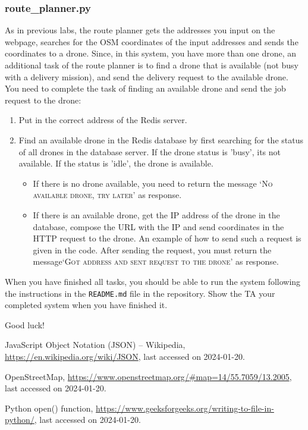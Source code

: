 \documentclass{article}
\begin{document}
\subsubsection{route\_planner.py}
As in previous labs, the route planner gets the addresses you input on the webpage, searches for the OSM coordinates of the input addresses and sends the coordinates to a drone. Since, in this system, you have more than one drone, an additional task of the route planner is to find a drone that is available (not busy with a delivery mission), and send the delivery request to the available drone. You need to complete the task of finding an available drone and send the job request to the drone:
\begin{enumerate}
    \item Put in the correct address of the Redis server.
    \item Find an available drone in the Redis database by first searching for the status of all drones in the database server. If the drone status is 'busy', its not available. If the status is 'idle', the drone is available.
    \begin{itemize}
        \item If there is no drone available, you need to return the message {\textsc{`No available drone, try later'}} as response.
        \item If there is an available drone, get the IP address of the drone in the database, compose the URL with the IP and send coordinates in the HTTP request to the drone. An example of how to send such a request is given in the code. After sending the request, you must return the message\textsc{`Got address and sent request to the drone'} as response.
    \end{itemize}
\end{enumerate}

When you have finished all tasks, you should be able to run the system following the instructions in the \texttt{README.md} file in the repository. Show the TA your completed system when you have finished it.

\vspace{1cm}
\begin{center}
\huge Good luck!
\end{center}

\begin{thebibliography}{10} 

 JavaScript Object Notation (JSON) -- Wikipedia, \url{https://en.wikipedia.org/wiki/JSON}, last accessed on 2024-01-20.

 OpenStreetMap, \url{https://www.openstreetmap.org/#map=14/55.7059/13.2005}, last accessed on 2024-01-20.


 Python open() function, \url{https://www.geeksforgeeks.org/writing-to-file-in-python/}, last accessed on 2024-01-20.

\end{thebibliography}
\end{document}
